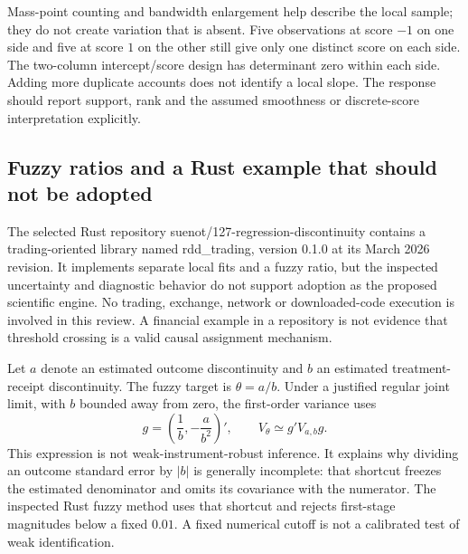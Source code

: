 Mass-point counting and bandwidth enlargement help describe the local
sample; they do not create variation that is absent. Five observations
at score $-1$ on one side and five at score $1$ on the other still give
only one distinct score on each side. The two-column intercept/score
design has determinant zero within each side. Adding more duplicate
accounts does not identify a local slope. The response should report
support, rank and the assumed smoothness or discrete-score interpretation
explicitly. \citep{exec23_otheriv_source_3,exec23_otheriv_reference}

\subsection{Fuzzy ratios and a Rust example that should not be adopted}
\label{exec23:otheriv-ratio}
The selected Rust repository suenot/127-regression-discontinuity
contains a trading-oriented library named rdd_trading, version 0.1.0
at its March 2026 revision. It implements separate local fits and a
fuzzy ratio, but the inspected uncertainty and diagnostic behavior
do not support adoption as the proposed scientific engine. No trading,
exchange, network or downloaded-code execution is involved in this
review. A financial example in a repository is not evidence that
threshold crossing is a valid causal assignment mechanism.
\citep{exec23_otheriv_source_4}

Let $a$ denote an estimated outcome discontinuity and $b$ an estimated
treatment-receipt discontinuity. The fuzzy target is $\theta=a/b$.
Under a justified regular joint limit, with $b$ bounded away from zero,
the first-order variance uses
\begin{equation}
 g=\left(\frac1b,-\frac{a}{b^2}\right)',
 \qquad V_\theta\simeq g'V_{a,b}g.
 \label{exec23:otheriv-delta}
\end{equation}
This expression is not weak-instrument-robust inference. It explains
why dividing an outcome standard error by $|b|$ is generally incomplete:
that shortcut freezes the estimated denominator and omits its covariance
with the numerator. The inspected Rust fuzzy method uses that shortcut
and rejects first-stage magnitudes below a fixed $0.01$. A fixed numerical
cutoff is not a calibrated test of weak identification.
\citep{exec23_otheriv_source_4}

